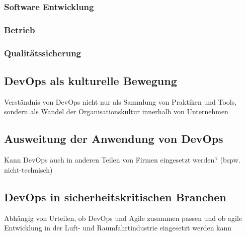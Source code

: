 \subsubsection{Software Entwicklung}

\subsubsection{Betrieb}

\subsubsection{Qualitätssicherung}

\subsection{DevOps als kulturelle Bewegung}
Verständnis von DevOps nicht nur als Sammlung von Praktiken und Tools, sondern als Wandel
der Organisationskultur innerhalb von Unternehmen

\subsection{Ausweitung der Anwendung von DevOps}
Kann DevOps auch in anderen Teilen von Firmen eingesetzt werden? (bspw. nicht-technisch)

\subsection{DevOps in sicherheitskritischen Branchen}
Abhängig von Urteilen, ob DevOps und Agile zusammen passen und ob agile Entwicklung in der
Luft- und Raumfahrtindustrie eingesetzt werden kann
